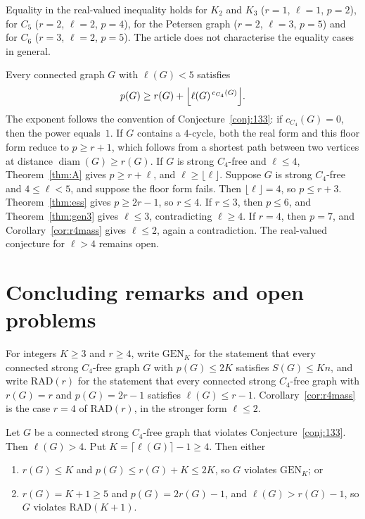 \documentclass[ASNA]{USG}
\theoremstyle{WBstyletwo}
\numberwithin{equation}{section}
\newcommand{\lr}{\ell}
\newcommand{\pp}{p}
\newcommand{\GEN}{\mathrm{GEN}}
\newcommand{\RAD}{\mathrm{RAD}}
\begin{document}
Equality in the real-valued inequality holds for $K_2$ and $K_3$ ($r=1$, $\lr=1$, $\pp=2$), for $C_5$ ($r=2$, $\lr=2$, $\pp=4$), for the Petersen graph ($r=2$, $\lr=3$, $\pp=5$) and for $C_6$ ($r=3$, $\lr=2$, $\pp=5$). The article does not characterise the equality cases in general.


\begin{remark}\label{rem:floor}
Every connected graph $G$ with $\lr(G)<5$ satisfies
\[
\pp(G)\ge r(G)+\Bigl\lfloor \lr(G)^{\,c_{C_4}(G)}\Bigr\rfloor.
\]
The exponent follows the convention of Conjecture~\ref{conj:133}: if $c_{C_4}(G)=0$, then the power equals~$1$. If $G$ contains a $4$-cycle, both the real form and this floor form reduce to $\pp\ge r+1$, which follows from a shortest path between two vertices at distance $\operatorname{diam}(G)\ge r(G)$. If $G$ is strong $C_4$-free and $\lr\le 4$, Theorem~\ref{thm:A} gives $\pp\ge r+\lr$, and $\lr\ge\lfloor\lr\rfloor$. Suppose $G$ is strong $C_4$-free and $4\le\lr<5$, and suppose the floor form fails. Then $\lfloor\lr\rfloor=4$, so $\pp\le r+3$. Theorem~\ref{thm:ess} gives $\pp\ge 2r-1$, so $r\le 4$. If $r\le 3$, then $\pp\le 6$, and Theorem~\ref{thm:gen3} gives $\lr\le 3$, contradicting $\lr\ge 4$. If $r=4$, then $\pp=7$, and Corollary~\ref{cor:r4mass} gives $\lr\le 2$, again a contradiction. The real-valued conjecture for $\lr>4$ remains open.
\end{remark}

\section{Concluding remarks and open problems}\label{sec:band}\label{sec:status}\label{sec:open}

For integers $K\ge 3$ and $r\ge 4$, write $\GEN_K$ for the statement that every connected strong $C_4$-free graph $G$ with $\pp(G)\le 2K$ satisfies $S(G)\le Kn$, and write $\RAD(r)$ for the statement that every connected strong $C_4$-free graph with $r(G)=r$ and $\pp(G)=2r-1$ satisfies $\lr(G)\le r-1$.
Corollary~\ref{cor:r4mass} is the case $r=4$ of $\RAD(r)$, in the stronger form $\lr\le 2$.

\begin{corollary}\label{cor:reduction}
Let $G$ be a connected strong $C_4$-free graph that violates Conjecture~\ref{conj:133}. Then $\lr(G)>4$. Put $K=\lceil\lr(G)\rceil-1\ge 4$. Then either
\begin{enumerate}
\item[(a)] $r(G)\le K$ and $\pp(G)\le r(G)+K\le 2K$, so $G$ violates $\GEN_K$; or
\item[(b)] $r(G)=K+1\ge 5$ and $\pp(G)=2r(G)-1$, and $\lr(G)>r(G)-1$, so $G$ violates $\RAD(K+1)$.
\end{enumerate}
\end{corollary}
\end{document}
